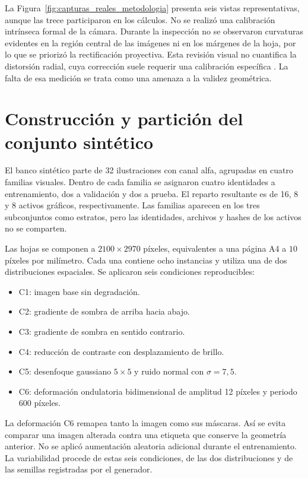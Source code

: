 La Figura~\ref{fig:capturas_reales_metodologia} presenta seis vistas representativas, aunque las trece participaron en los cálculos. No se realizó una calibración intrínseca formal de la cámara. Durante la inspección no se observaron curvaturas evidentes en la región central de las imágenes ni en los márgenes de la hoja, por lo que se priorizó la rectificación proyectiva. Esta revisión visual no cuantifica la distorsión radial, cuya corrección suele requerir una calibración específica \cite{Madejski2024}. La falta de esa medición se trata como una amenaza a la validez geométrica.

\section{Construcción y partición del conjunto sintético}

El banco sintético parte de 32 ilustraciones con canal alfa, agrupadas en cuatro familias visuales. Dentro de cada familia se asignaron cuatro identidades a entrenamiento, dos a validación y dos a prueba. El reparto resultante es de 16, 8 y 8 activos gráficos, respectivamente. Las familias aparecen en los tres subconjuntos como estratos, pero las identidades, archivos y hashes de los activos no se comparten.

Las hojas se componen a $2100\times2970$ píxeles, equivalentes a una página A4 a $10$ píxeles por milímetro. Cada una contiene ocho instancias y utiliza una de dos distribuciones espaciales. Se aplicaron seis condiciones reproducibles:

\begin{itemize}
    \item C1: imagen base sin degradación.
    \item C2: gradiente de sombra de arriba hacia abajo.
    \item C3: gradiente de sombra en sentido contrario.
    \item C4: reducción de contraste con desplazamiento de brillo.
    \item C5: desenfoque gaussiano $5\times5$ y ruido normal con $\sigma=7{,}5$.
    \item C6: deformación ondulatoria bidimensional de amplitud 12 píxeles y periodo 600 píxeles.
\end{itemize}

La deformación C6 remapea tanto la imagen como sus máscaras. Así se evita comparar una imagen alterada contra una etiqueta que conserve la geometría anterior. No se aplicó aumentación aleatoria adicional durante el entrenamiento. La variabilidad procede de estas seis condiciones, de las dos distribuciones y de las semillas registradas por el generador.

